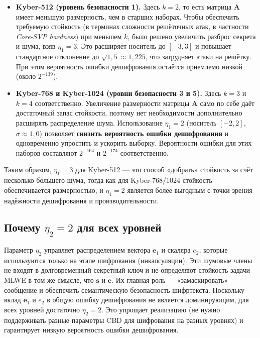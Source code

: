 \documentclass[11pt,a4paper]{article}
\begin{document}
\begin{itemize}
    \item \textbf{Kyber-512 (уровень безопасности 1).} Здесь \(k=2\), то есть матрица \(\mathbf{A}\) имеет меньшую размерность, чем в старших наборах. Чтобы обеспечить требуемую стойкость (в терминах сложности решёточных атак, в частности \textit{Core-SVP hardness}) при меньшем \(k\), было решено увеличить разброс секрета и шума, взяв \(\eta_1=3\). Это расширяет носитель до \([-3,3]\) и повышает стандартное отклонение до \(\sqrt{1{,}5}\approx 1{,}225\), что затрудняет атаки на решётку. При этом вероятность ошибки дешифрования остаётся приемлемо низкой (около \(2^{-139}\)).

    \item \textbf{Kyber-768 и Kyber-1024 (уровни безопасности 3 и 5).} Здесь \(k=3\) и \(k=4\) соответственно. Увеличение размерности матрицы \(\mathbf{A}\) само по себе даёт достаточный запас стойкости, поэтому нет необходимости дополнительно расширять распределение шума. Использование \(\eta_1=2\) (носитель \([-2,2]\), \(\sigma\approx 1{,}0\)) позволяет \textbf{снизить вероятность ошибки дешифрования} и одновременно упростить и ускорить выборку. Вероятности ошибки для этих наборов составляют \(2^{-164}\) и \(2^{-174}\) соответственно.
\end{itemize}

Таким образом, \(\eta_1=3\) для Kyber-512 — это способ «добрать» стойкость за счёт несколько большего шума, тогда как для Kyber-768/1024 стойкость обеспечивается размерностью, и \(\eta_1=2\) является более выгодным с точки зрения надёжности дешифрования и производительности.

\subsection{Почему \(\eta_2=2\) для всех уровней}

Параметр \(\eta_2\) управляет распределением вектора \(\mathbf{e}_1\) и скаляра \(e_2\), которые используются только на этапе шифрования (инкапсуляции). Эти шумовые члены не входят в долговременный секретный ключ и не определяют стойкость задачи MLWE в том же смысле, что \(\mathbf{s}\) и \(\mathbf{e}\). Их главная роль — «замаскировать» сообщение и обеспечить семантическую безопасность шифртекста. Поскольку вклад \(\mathbf{e}_1\) и \(e_2\) в общую ошибку дешифрования не является доминирующим, для всех уровней достаточно \(\eta_2=2\). Это упрощает реализацию (не нужно поддерживать разные параметры CBD для шифрования на разных уровнях) и гарантирует низкую вероятность ошибки дешифрования.
\end{document}

